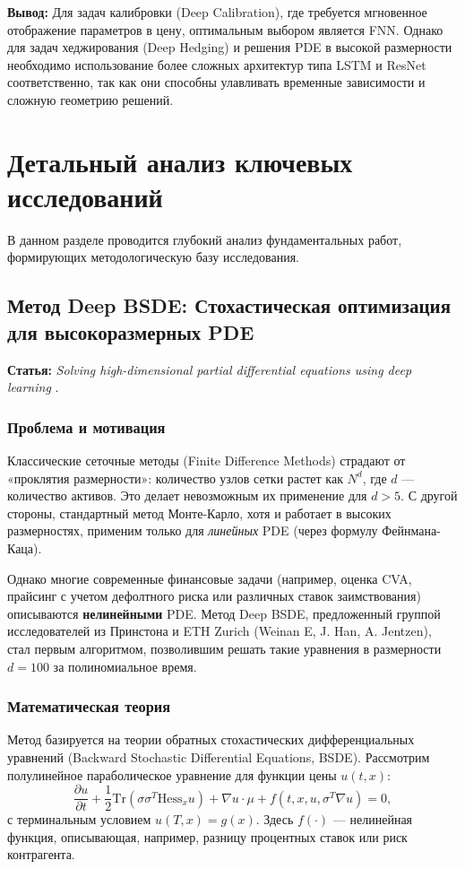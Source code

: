\textbf{Вывод:} Для задач калибровки (Deep Calibration), где требуется мгновенное отображение параметров в цену, оптимальным выбором является FNN. Однако для задач хеджирования (Deep Hedging) и решения PDE в высокой размерности необходимо использование более сложных архитектур типа LSTM и ResNet соответственно, так как они способны улавливать временные зависимости и сложную геометрию решений.

\section{Детальный анализ ключевых исследований}

В данном разделе проводится глубокий анализ фундаментальных работ, формирующих методологическую базу исследования.

\subsection{Метод Deep BSDE: Стохастическая оптимизация для высокоразмерных PDE}
\textbf{Статья:} \textit{Solving high-dimensional partial differential equations using deep learning} \cite{Han2018}.

\subsubsection{Проблема и мотивация}
Классические сеточные методы (Finite Difference Methods) страдают от «проклятия размерности»: количество узлов сетки растет как $N^d$, где $d$ — количество активов. Это делает невозможным их применение для $d > 5$. С другой стороны, стандартный метод Монте-Карло, хотя и работает в высоких размерностях, применим только для \textit{линейных} PDE (через формулу Фейнмана-Каца).

Однако многие современные финансовые задачи (например, оценка CVA, прайсинг с учетом дефолтного риска или различных ставок заимствования) описываются \textbf{нелинейными} PDE. Метод Deep BSDE, предложенный группой исследователей из Принстона и ETH Zurich (Weinan E, J. Han, A. Jentzen), стал первым алгоритмом, позволившим решать такие уравнения в размерности $d=100$ за полиномиальное время.

\subsubsection{Математическая теория}
Метод базируется на теории обратных стохастических дифференциальных уравнений (Backward Stochastic Differential Equations, BSDE). Рассмотрим полулинейное параболическое уравнение для функции цены $u(t, x)$:
\begin{equation}
    \frac{\partial u}{\partial t} + \frac{1}{2}\text{Tr}(\sigma\sigma^T \text{Hess}_x u) + \nabla u \cdot \mu + f(t, x, u, \sigma^T \nabla u) = 0,
\end{equation}
с терминальным условием $u(T, x) = g(x)$. Здесь $f(\cdot)$ — нелинейная функция, описывающая, например, разницу процентных ставок или риск контрагента.

